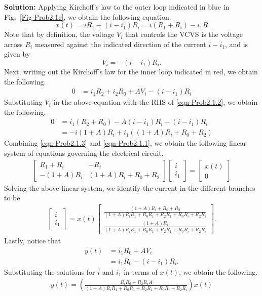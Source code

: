 \documentclass[11pt,a4paper]{book}
\theoremstyle{plain}
\numberwithin{equation}{section}
\newenvironment{solution}{\begin{footnotesize}\textbf{Solution:}}{\end{footnotesize}}
\newenvironment{excersizelist}{%
  \renewcommand*{\theenumi}{\thechapter.\arabic{enumi}}%
  \newcommand\itemadvanced{\stepcounter{enumi}\item[$\ast$\, \theenumi.]}
  \begin{enumerate}
}{%
  \end{enumerate}
}
\begin{document}
\begin{excersizelist}
\begin{solution}
Applying Kirchoff's law to the outer loop indicated in blue in Fig.~\ref{Fig-Prob2.1c}, we obtain the following equation.
\begin{equation}
x(t) = iR_1+(i-i_1)R_i = i(R_1+R_i) - i_1 R \label{eqn-Prob2.1.1}
\end{equation}
Note that by definition, the voltage $V_i$ that controls the VCVS is the voltage across $R_i$ measured against the indicated direction of the current $i-i_1$, and is given by
\begin{equation}
V_i = -(i-i_1)R_i. \label{eqn-Prob2.1.2}
\end{equation}
Next, writing out the Kirchoff's law for the inner loop indicated in red, we obtain the following.
\begin{align}
0 &= i_1 R_2 + i_2 R_0 + AV_i - (i-i_1) R_i
\end{align}
Substituting $V_i$ in the above equation with the RHS of \eqref{eqn-Prob2.1.2}, we obtain the following.
\begin{align}
0&= i_1 (R_2+R_0) - A(i-i_1)R_i-(i-i_1)R_i\\
&= -i(1+A)R_i+i_1((1+A)R_i+R_0+R_2)\label{eqn-Prob2.1.3}
\end{align}
Combining \eqref{eqn-Prob2.1.3} and \eqref{eqn-Prob2.1.1}, we obtain the following linear system of equations governing the electrical circuit.
\begin{align}
\left[\begin{array}{cc} R_1+R_i &  -R_i\\ -(1+A)R_i & (1+A)R_i+R_0+R_2\end{array}\right]\left[\begin{array}{c} i\\ i_1\end{array}\right] = \left[\begin{array}{c} x(t)\\ 0\end{array}\right]
\end{align}
Solving the above linear system, we identify the current in the different branches to be
\begin{align}
\left[\begin{array}{c} i\\ i_1\end{array}\right] = x(t)\left[\begin{array}{c} \frac{ (1+A)R_i+R_0+R_2}{(1+A) R_iR_1+R_0R_1+R_2R_1+R_0R_i+R_2R_i}\\ \frac{(1+A)R_i}{(1+A) R_iR_1+R_0R_1+R_2R_1+R_0R_i+R_2R_i}\end{array}\right].\label{eqn-Prob2.1.4}
\end{align}
Lastly, notice that
\begin{align}
y(t) &= i_1 R_0 + A V_i \\
 & = i_1 R_0 - (i-i_1)R_i.
\end{align}
Substituting the solutions for $i$ and $i_1$ in terms of $x(t)$, we obtain the following.
\begin{align}
y(t)= \left( \frac{R_iR_0 - R_2R_iA}{(1+A) R_iR_1+R_0R_1+R_2R_1+R_0R_i+R_2R_i} \right)x(t)
\end{align}



\end{solution}
\end{excersizelist}
\end{document}
